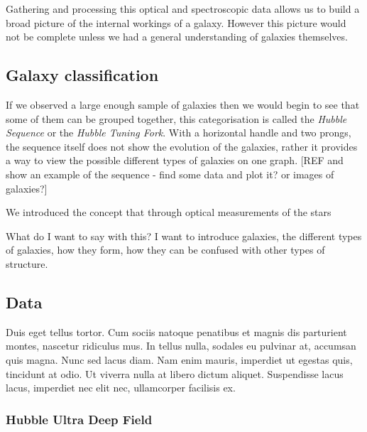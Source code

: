 \documentclass[12pt, twocolumn]{revtex4}    %
\begin{document}
Gathering and processing this optical and spectroscopic data allows us to build a broad picture of the internal workings of a galaxy. However this picture would not be complete unless we had a general understanding of galaxies themselves. 

\subsection{Galaxy classification}

If we observed a large enough sample of galaxies then we would begin to see that some of them can be grouped together, this categorisation is called the \textit{Hubble Sequence} or the \textit{Hubble Tuning Fork}. With a horizontal handle and two prongs, the sequence itself does not show the evolution of the galaxies, rather it provides a way to view the possible different types of galaxies on one graph. [REF and show an example of the sequence - find some data and plot it? or images of galaxies?] 

We introduced the concept that through optical measurements of the stars 

What do I want to say with this? I want to introduce galaxies, the different types of galaxies, how they form, how they can be confused with other types of structure. 

\subsection{Data} 

Duis eget tellus tortor. Cum sociis natoque penatibus et magnis dis parturient montes, nascetur ridiculus mus. In tellus nulla, sodales eu pulvinar at, accumsan quis magna. Nunc sed lacus diam. Nam enim mauris, imperdiet ut egestas quis, tincidunt at odio. Ut viverra nulla at libero dictum aliquet. Suspendisse lacus lacus, imperdiet nec elit nec, ullamcorper facilisis ex. 

\subsubsection{Hubble Ultra Deep Field} 
\end{document}
